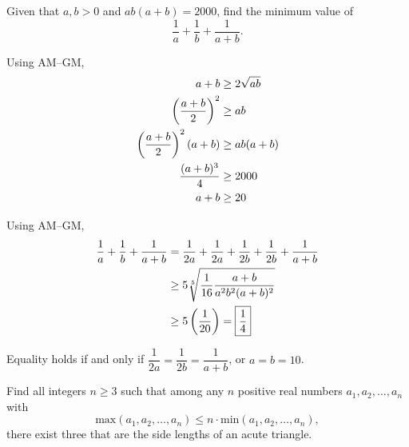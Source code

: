 \begin{prbm}
Given that $a,b>0$ and $ab(a+b)=2000$, find the minimum value of 
\[ \frac{1}{a}+\frac{1}{b}+\frac{1}{a+b}. \]
\end{prbm}
\begin{solution}
Using AM--GM, 
\begin{align*}
a+b &\ge 2\sqrt{ab} \\
\left(\frac{a+b}{2}\right)^2 &\ge ab \\
\left(\frac{a+b}{2}\right)^2(a+b) &\ge ab(a+b) \\
\frac{(a+b)^3}{4} &\ge 2000 \\
a+b &\ge 20
\end{align*}

Using AM--GM,
\begin{align*}
\frac{1}{a}+\frac{1}{b}+\frac{1}{a+b}
&= \frac{1}{2a}+\frac{1}{2a}+\frac{1}{2b}+\frac{1}{2b}+\frac{1}{a+b} \\
&\ge 5\sqrt[5]{\frac{1}{16}\frac{a+b}{a^2b^2(a+b)^2}} \\
&\ge 5\left(\frac{1}{20}\right)=\boxed{\frac{1}{4}}
\end{align*}

Equality holds if and only if $\dfrac{1}{2a}=\dfrac{1}{2b}=\dfrac{1}{a+b}$, or $a=b=10$.
\end{solution}
\pagebreak

\begin{prbm}
Find all integers $n \ge 3$ such that among any $n$ positive real numbers $a_1, a_2, \dots, a_n$ with 
\[ \text{max}(a_1, a_2, \dots, a_n) \le n \cdot \text{min}(a_1, a_2, \dots , a_n), \]
there exist three that are the side lengths of an acute triangle.
\end{prbm}

